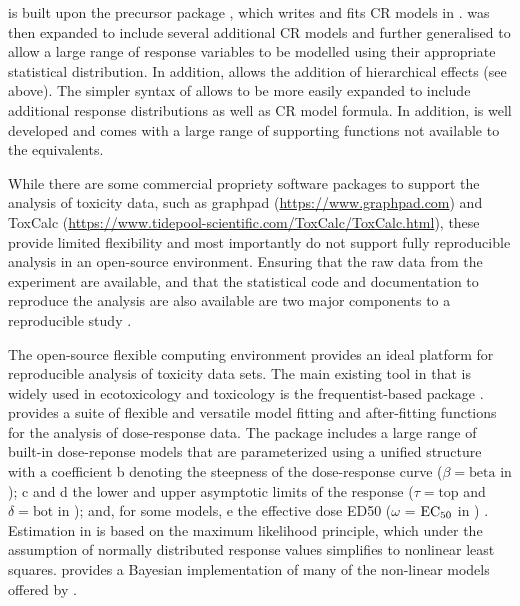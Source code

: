 \documentclass[
  shortnames]{jss}
\begin{document}
 is built upon the precursor  package  \citep{fisher2020}, which writes and fits CR models in  \citep{Plummer2003}.  was then expanded to include several additional CR models and further generalised to allow a large range of response variables to be modelled using their appropriate statistical distribution. In addition,  allows the addition of hierarchical effects (see above). The simpler syntax of  allows  to be more easily expanded to include additional response distributions as well as CR model formula. In addition,  is well developed and comes with a large range of supporting functions not available to the  equivalents.

While there are some commercial propriety software packages to support the analysis of toxicity data, such as graphpad (\url{https://www.graphpad.com}) and ToxCalc (\url{https://www.tidepool-scientific.com/ToxCalc/ToxCalc.html}), these provide limited flexibility and most importantly do not support fully reproducible analysis in an open-source environment. Ensuring that the raw data from the experiment are available, and that the statistical code and documentation to reproduce the analysis are also available are two major components to a reproducible study \citep{peng2015}.

The open-source flexible computing environment  provides an ideal platform for reproducible analysis of toxicity data sets. The main existing tool in  that is widely used in ecotoxicology and toxicology is the frequentist-based package  \citep{Ritz2016}.  provides a suite of flexible and versatile model fitting and after-fitting functions for the analysis of dose-response data. The package includes a large range of built-in dose-reponse models that are parameterized using a unified structure with a coefficient b denoting the steepness of the dose-response curve (\(\beta = \text{beta}\) in ); c and d the lower and upper asymptotic limits of the response (\(\tau = \text{top}\) and \(\delta = \text{bot}\) in ); and, for some models, e the effective dose ED50 (\(\omega\) = \(\text{EC\textsubscript{50}}\) in ) \citep{Ritz2016}. Estimation in  is based on the maximum likelihood principle, which under the assumption of normally distributed response values simplifies to nonlinear least squares.  provides a Bayesian implementation of many of the non-linear models offered by .
\end{document}
